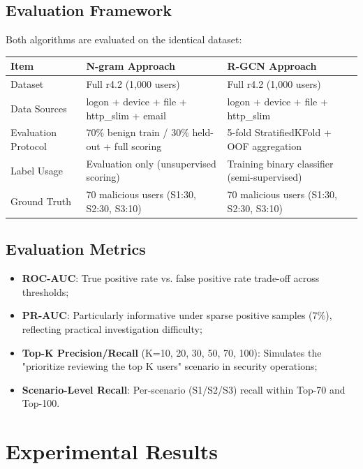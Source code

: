 \documentclass[
  a4paper,
  11pt]{article}
\newcounter{none} %
\providecommand{\tightlist}{%
  \setlength{\itemsep}{0pt}\setlength{\parskip}{0pt}}
\begin{document}
\subsection{Evaluation Framework}\label{evaluation-framework}

Both algorithms are evaluated on the identical dataset:

{\def\LTcaptype{none} %
\begin{longtable}[]{@{}L{0.24}L{0.26}L{0.42}@{}}
\toprule\noalign{}
Item & N-gram Approach & R-GCN Approach \\
\midrule\noalign{}
\endhead
\bottomrule\noalign{}
\endlastfoot
Dataset & Full r4.2 (1,000 users) & Full r4.2 (1,000 users) \\
Data Sources & logon + device + file + http\_slim + email & logon +
device + file + http\_slim \\
Evaluation Protocol & 70\% benign train / 30\% held-out + full scoring &
5-fold StratifiedKFold + OOF aggregation \\
Label Usage & Evaluation only (unsupervised scoring) & Training binary
classifier (semi-supervised) \\
Ground Truth & 70 malicious users (S1:30, S2:30, S3:10) & 70 malicious
users (S1:30, S2:30, S3:10) \\
\end{longtable}
}

\subsection{Evaluation Metrics}\label{evaluation-metrics}

\begin{itemize}
\tightlist
\item
  \textbf{ROC-AUC}: True positive rate vs. false positive rate trade-off
  across thresholds;
\item
  \textbf{PR-AUC}: Particularly informative under sparse positive
  samples (7\%), reflecting practical investigation difficulty;
\item
  \textbf{Top-K Precision/Recall} (K=10, 20, 30, 50, 70, 100): Simulates
  the "prioritize reviewing the top K users" scenario in security
  operations;
\item
  \textbf{Scenario-Level Recall}: Per-scenario (S1/S2/S3) recall within
  Top-70 and Top-100.
\end{itemize}

\section{Experimental Results}\label{experimental-results}
\end{document}
